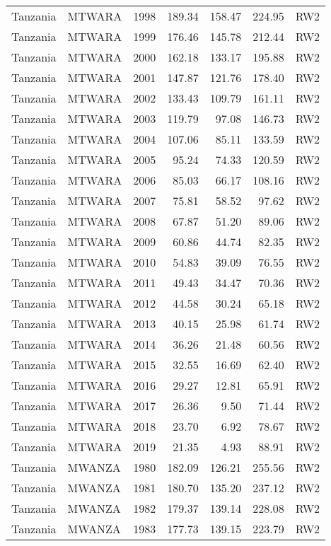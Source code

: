 \begin{longtable}{lllrrrl}
  Tanzania & MTWARA & 1998 & 189.34 & 158.47 & 224.95 & RW2 \\ 
  Tanzania & MTWARA & 1999 & 176.46 & 145.78 & 212.44 & RW2 \\ 
  Tanzania & MTWARA & 2000 & 162.18 & 133.17 & 195.88 & RW2 \\ 
  Tanzania & MTWARA & 2001 & 147.87 & 121.76 & 178.40 & RW2 \\ 
  Tanzania & MTWARA & 2002 & 133.43 & 109.79 & 161.11 & RW2 \\ 
  Tanzania & MTWARA & 2003 & 119.79 & 97.08 & 146.73 & RW2 \\ 
  Tanzania & MTWARA & 2004 & 107.06 & 85.11 & 133.59 & RW2 \\ 
  Tanzania & MTWARA & 2005 & 95.24 & 74.33 & 120.59 & RW2 \\ 
  Tanzania & MTWARA & 2006 & 85.03 & 66.17 & 108.16 & RW2 \\ 
  Tanzania & MTWARA & 2007 & 75.81 & 58.52 & 97.62 & RW2 \\ 
  Tanzania & MTWARA & 2008 & 67.87 & 51.20 & 89.06 & RW2 \\ 
  Tanzania & MTWARA & 2009 & 60.86 & 44.74 & 82.35 & RW2 \\ 
  Tanzania & MTWARA & 2010 & 54.83 & 39.09 & 76.55 & RW2 \\ 
  Tanzania & MTWARA & 2011 & 49.43 & 34.47 & 70.36 & RW2 \\ 
  Tanzania & MTWARA & 2012 & 44.58 & 30.24 & 65.18 & RW2 \\ 
  Tanzania & MTWARA & 2013 & 40.15 & 25.98 & 61.74 & RW2 \\ 
  Tanzania & MTWARA & 2014 & 36.26 & 21.48 & 60.56 & RW2 \\ 
  Tanzania & MTWARA & 2015 & 32.55 & 16.69 & 62.40 & RW2 \\ 
  Tanzania & MTWARA & 2016 & 29.27 & 12.81 & 65.91 & RW2 \\ 
  Tanzania & MTWARA & 2017 & 26.36 & 9.50 & 71.44 & RW2 \\ 
  Tanzania & MTWARA & 2018 & 23.70 & 6.92 & 78.67 & RW2 \\ 
  Tanzania & MTWARA & 2019 & 21.35 & 4.93 & 88.91 & RW2 \\ 
  Tanzania & MWANZA & 1980 & 182.09 & 126.21 & 255.56 & RW2 \\ 
  Tanzania & MWANZA & 1981 & 180.70 & 135.20 & 237.12 & RW2 \\ 
  Tanzania & MWANZA & 1982 & 179.37 & 139.14 & 228.08 & RW2 \\ 
  Tanzania & MWANZA & 1983 & 177.73 & 139.15 & 223.79 & RW2 \\ 

\end{longtable}
